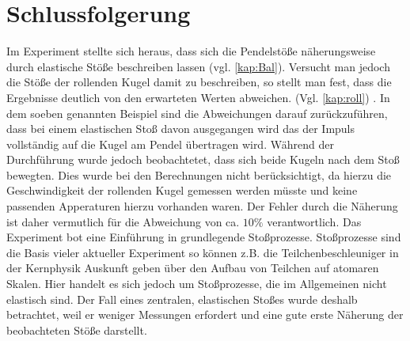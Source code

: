 
\section{Schlussfolgerung}
Im Experiment stellte sich heraus, dass sich die Pendelstöße näherungsweise durch elastische Stöße beschreiben lassen (vgl. \cref{kap:Bal}). Versucht man jedoch die Stöße der rollenden Kugel damit zu beschreiben, so stellt man fest, dass die Ergebnisse deutlich von den erwarteten Werten abweichen. (Vgl. \cref{kap:roll}) .
In dem soeben genannten Beispiel sind die Abweichungen darauf zurückzuführen, dass bei einem elastischen Stoß davon ausgegangen wird das der Impuls vollständig auf die Kugel am Pendel übertragen wird. Während der Durchführung wurde jedoch beobachtetet, dass sich beide Kugeln nach dem Stoß bewegten. Dies wurde bei den Berechnungen nicht berücksichtigt, da hierzu die Geschwindigkeit der rollenden Kugel gemessen werden müsste und keine passenden Apperaturen hierzu vorhanden waren. Der Fehler durch die Näherung ist daher vermutlich für die Abweichung von ca. $10\%$ verantwortlich.
Das Experiment bot eine Einführung in grundlegende Stoßprozesse.
Stoßprozesse sind die Basis vieler aktueller Experiment so können z.B. die Teilchenbeschleuniger in der Kernphysik Auskunft geben über den Aufbau von Teilchen auf atomaren Skalen. Hier handelt es sich jedoch um Stoßprozesse, die im Allgemeinen nicht elastisch sind.
Der Fall eines zentralen, elastischen Stoßes wurde deshalb betrachtet, weil er weniger Messungen erfordert und eine gute erste Näherung der beobachteten Stöße darstellt. 





